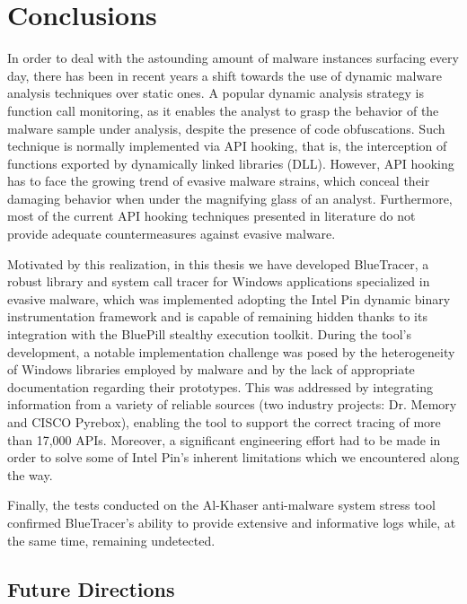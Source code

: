 
\chapter{Conclusions} \label{conclusion}

In order to deal with the astounding amount of malware instances surfacing every day, there has been in recent years a shift towards the use of dynamic malware analysis techniques over static ones. A popular dynamic analysis strategy is function call monitoring, as it enables the analyst to grasp the behavior of the malware sample under analysis, despite the presence of code obfuscations. Such technique is normally implemented via API hooking, that is, the interception of functions exported by dynamically linked libraries (DLL). However, API hooking has to face the growing trend of evasive malware strains, which conceal their damaging behavior when under the magnifying glass of an analyst. Furthermore, most of the current API hooking techniques presented in literature do not provide adequate countermeasures against evasive malware.

Motivated by this realization, in this thesis we have developed BlueTracer, a robust library and system call tracer for Windows applications specialized in evasive malware, which was implemented adopting the Intel Pin dynamic binary instrumentation framework and is capable of remaining hidden thanks to its integration with the BluePill stealthy execution toolkit. During the tool's development, a notable implementation challenge was posed by the heterogeneity of Windows libraries employed by malware and by the lack of appropriate documentation regarding their prototypes. This was addressed by integrating information from a variety of reliable sources (two industry projects: Dr. Memory and CISCO Pyrebox), enabling the tool to support the correct tracing of more than 17,000 APIs. Moreover, a significant engineering effort had to be made in order to solve some of Intel Pin's inherent limitations which we encountered along the way.

Finally, the tests conducted on the Al-Khaser anti-malware system stress tool confirmed BlueTracer's ability to provide extensive and informative logs while, at the same time, remaining undetected.    

\section{Future Directions}

